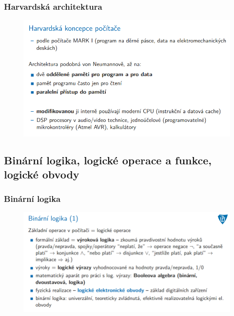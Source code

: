 \documentclass[10pt,a4paper]{article}
\begin{document}
\subsubsection{Harvardská architektura}
\begin{figure} [h]
	\includegraphics[scale=0.65]{img/prvni_odstavec/otazka1/harvardska_koncepce.png}	
\end{figure}


\clearpage
\subsection{Binární logika, logické operace a funkce, logické obvody}
\subsubsection{Binární logika}
\begin{figure} [h]
	\includegraphics[scale=0.65]{img/prvni_odstavec/otazka2/binarni_logika1.png}	
\end{figure}
\end{document}
